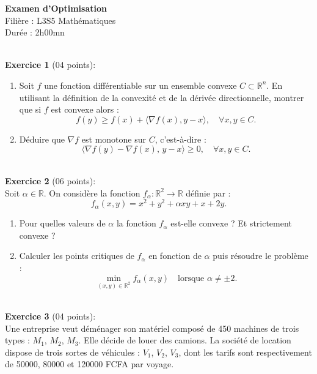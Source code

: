 
	\begin{center}
		\textbf{\sc Examen d'Optimisation}\\
		Filière : L3S5 Mathématiques\\
		Durée : 2h00mn\\
	\end{center}
\qquad\\
\textbf{Exercice 1} (04 points):\\

\begin{enumerate}
	\item Soit $f$ une fonction différentiable sur un ensemble convexe 
	$C \subset \mathbb{R}^n$.  
	En utilisant la définition de la convexité et de la dérivée directionnelle, 
	montrer que si $f$ est convexe alors :
	\[
	f(y) \ge f(x) + \langle \nabla f(x), y - x \rangle, \quad \forall x,y \in C.
	\]
	
	\item Déduire que $\nabla f$ est monotone sur $C$, c’est-à-dire :
	\[
	\langle \nabla f(y) - \nabla f(x),\, y - x \rangle \ge 0, \quad \forall x,y \in C.
	\]
\end{enumerate}

\qquad\\
\textbf{Exercice 2} (06 points):\\

Soit $\alpha \in \mathbb{R}$.  
On considère la fonction $f_\alpha : \mathbb{R}^2 \to \mathbb{R}$ définie par :
\[
f_\alpha(x,y) = x^2 + y^2 + \alpha xy + x + 2y.
\]

\begin{enumerate}
	\item Pour quelles valeurs de $\alpha$ la fonction $f_\alpha$ est-elle convexe ?  
	Et strictement convexe ?
	
	\item Calculer les points critiques de $f_\alpha$ en fonction de $\alpha$ puis
	résoudre le problème :
	\[
	\min_{(x,y)\in\mathbb{R}^2} f_\alpha (x,y)
	\quad \text{lorsque } \alpha \ne \pm 2.
	\]
\end{enumerate}

\qquad\\
\textbf{Exercice 3} (04 points):\\

Une entreprise veut déménager son matériel composé de 450 machines 
de trois types : $M_1$, $M_2$, $M_3$.  
Elle décide de louer des camions.  
La société de location dispose de trois sortes de véhicules : 
$V_1$, $V_2$, $V_3$, dont les tarifs sont respectivement de  
50000, 80000 et 120000 FCFA par voyage.

